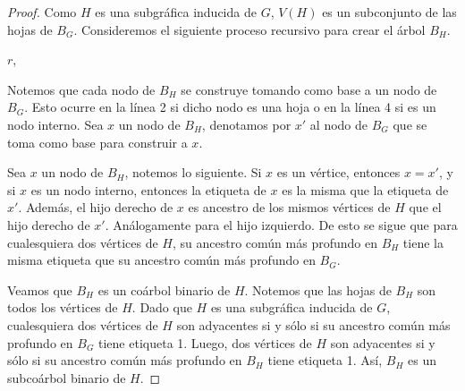 \begin{proof}
Como $H$ es una subgráfica inducida de $G$, $V(H)$ es un subconjunto de las hojas de $B_G$. Consideremos el siguiente proceso recursivo para crear el árbol $B_H$.

\begin{algorithm}[H]
\DontPrintSemicolon
{}
    \Return $r$,
\end{algorithm}

Notemos que cada nodo de $B_H$ se construye tomando como base a un nodo de $B_G$. Esto ocurre en la línea 2 si dicho nodo es una hoja o en la línea 4 si es un nodo interno. Sea $x$ un nodo de $B_H$, denotamos por $x'$ al nodo de $B_G$ que se toma como base para construir a $x$.

Sea $x$ un nodo de $B_H$, notemos lo siguiente. Si $x$ es un vértice, entonces $x = x'$, y si $x$ es un nodo interno, entonces la etiqueta de $x$ es la misma que la etiqueta de $x'$. Además, el hijo derecho de $x$ es ancestro de los mismos vértices de $H$ que el hijo derecho de $x'$. Análogamente para el hijo izquierdo. De esto se sigue que para cualesquiera dos vértices de $H$, su ancestro común más profundo en $B_H$ tiene la misma etiqueta que su ancestro común más profundo en $B_G$.

Veamos que $B_H$ es un coárbol binario de $H$. Notemos que las hojas de $B_H$ son todos los vértices de $H$. Dado que $H$ es una subgráfica inducida de $G$, cualesquiera dos vértices de $H$ son adyacentes si y sólo si su ancestro común más profundo en $B_G$ tiene etiqueta 1. Luego, dos vértices de $H$ son adyacentes si y sólo si su ancestro común más profundo en $B_H$ tiene etiqueta 1. Así, $B_H$ es un subcoárbol binario de $H$.


\end{proof}
